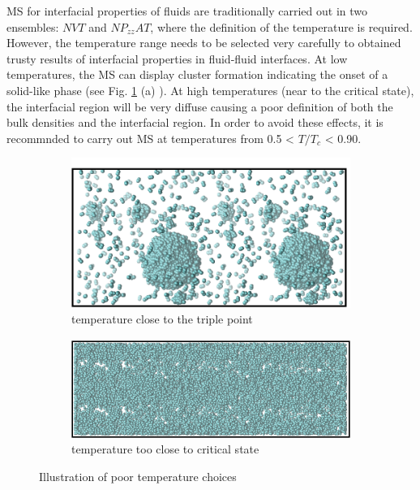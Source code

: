 \documentclass[9pt,tutorial]{livecoms}
\begin{document}
MS for interfacial properties of fluids are traditionally carried out in two
ensembles: $NVT$ and $NP_{zz}AT$, where the definition
of the temperature is required. However, the temperature range needs to be
selected very carefully to obtained trusty results of interfacial properties in
fluid-fluid interfaces. At low temperatures, the MS can display
cluster formation indicating the onset of a solid-like phase (see Fig. \ref{fig:25} (a) ).
At high temperatures (near to the critical state), the interfacial region will
be very diffuse causing a poor definition of both the bulk densities and the
interfacial region. In order to avoid these effects, it is recommnded to
carry out MS at temperatures from 0.5 {\textless} $T/T_{c}$
{\textless} 0.90.

\begin{figure}
	\begin{subfigure}{0.38\textwidth} %
    \includegraphics[width=1\textwidth]{gfx/image75.png}
    \caption{temperature close to the triple point}
	\end{subfigure}
	\begin{subfigure}{0.38\textwidth} %
    \includegraphics[width=1\textwidth]{gfx/image76.png}
    \caption{temperature too close to critical state}
	\end{subfigure}
\caption{Illustration of poor temperature choices}
\label{fig:25}
\end{figure}
\end{document}
